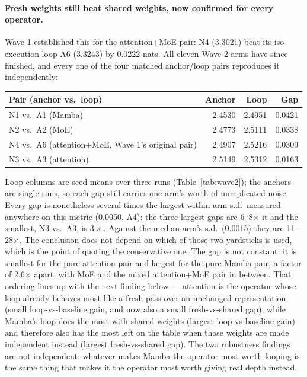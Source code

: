 \documentclass[11pt,a4paper]{article}
\begin{document}
\paragraph{Fresh weights still beat shared weights, now confirmed for every operator.} Wave 1
established this for the attention+MoE pair: N4 (3.3021) beat its iso-execution loop A6 (3.3243) by
0.0222 nats. All eleven Wave 2 arms have since finished, and every one of the four matched
anchor/loop pairs reproduces it independently:
\begin{center}
\begin{tabular}{lrrr}
\toprule
Pair (anchor vs.\ loop) & Anchor & Loop & Gap \\
\midrule
N1 vs.\ A1 (Mamba)            & 2.4530 & 2.4951 & 0.0421 \\
N2 vs.\ A2 (MoE)               & 2.4773 & 2.5111 & 0.0338 \\
N4 vs.\ A6 (attention+MoE, Wave 1's original pair) & 2.4907 & 2.5216 & 0.0309 \\
N3 vs.\ A3 (attention)         & 2.5149 & 2.5312 & 0.0163 \\
\bottomrule
\end{tabular}
\end{center}
Loop columns are seed means over three runs (Table~\ref{tab:wave2}); the anchors are single runs, so
each gap still carries one arm's worth of unreplicated noise. Every gap is nonetheless several times
the largest within-arm s.d.\ measured anywhere on this metric (0.0050, A4): the three largest gaps
are 6--8$\times$ it and the smallest, N3 vs.\ A3, is $3\times$. Against the median arm's s.d.\
(0.0015) they are 11--28$\times$. The conclusion does not depend on which of those two yardsticks is
used, which is the point of quoting the conservative one.
The gap is not constant: it is smallest for the pure-attention pair and largest for the pure-Mamba
pair, a factor of 2.6$\times$ apart, with MoE and the mixed attention+MoE pair in between. That
ordering lines up with the next finding below --- attention is the operator whose loop already
behaves most like a fresh pass over an unchanged representation (small loop-vs-baseline gain, and
now also a small fresh-vs-shared gap), while Mamba's loop does the most with shared weights
(largest loop-vs-baseline gain) and therefore also has the most left on the table when those weights
are made independent instead (largest fresh-vs-shared gap). The two robustness findings are not
independent: whatever makes Mamba the operator most worth looping is the same thing that makes it
the operator most worth giving real depth instead.
\end{document}
